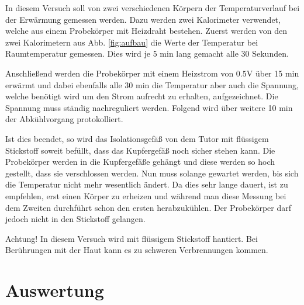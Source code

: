 \documentclass[12pt,a4paper,titlepage,headinclude,bibtotoc]{scrartcl}
\begin{document}
In diesem Versuch soll von zwei verschiedenen Körpern der Temperaturverlauf bei der Erwärmung gemessen werden.
Dazu werden zwei Kalorimeter verwendet, welche aus einem Probekörper mit Heizdraht bestehen.
Zuerst werden von den zwei Kalorimetern aus Abb. \ref{fig:aufbau} die Werte der Temperatur bei Raumtemperatur gemessen.
Dies wird je 5 min lang gemacht alle 30 Sekunden.

Anschließend werden die Probekörper mit einem Heizstrom von $0.5\si\volt$ über 15 min erwärmt und dabei ebenfalls alle 30 min die Temperatur aber auch die Spannung, welche benötigt wird um den Strom aufrecht zu erhalten, aufgezeichnet.
Die Spannung muss ständig nachreguliert werden.
Folgend wird über weitere 10 min der Abkühlvorgang protokolliert.

Ist dies beendet, so wird das Isolationsgefäß von dem Tutor mit flüssigem Stickstoff soweit befüllt, dass das Kupfergefäß noch sicher stehen kann.
Die Probekörper werden in die Kupfergefäße gehängt und diese werden so hoch gestellt, dass sie verschlossen werden.
Nun muss solange gewartet werden, bis sich die Temperatur  nicht mehr wesentlich ändert.
Da dies sehr lange dauert, ist zu empfehlen, erst einen Körper zu erheizen und während man diese Messung bei dem Zweiten durchführt schon den ersten herabzukühlen.
Der Probekörper darf jedoch nicht in den Stickstoff gelangen.\newline

Achtung! In diesem Versuch wird mit flüssigem Stickstoff hantiert.
Bei Berührungen mit der Haut kann es zu schweren Verbrennungen kommen.

\section{Auswertung}
\label{sec:auswertung}
\end{document}
